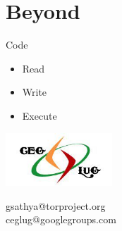 \documentclass{beamer}
\begin{document}
 \section{Beyond}
 \begin{frame} {Code}
  \begin{itemize} 
   \item Read
   \item Write
   \item Execute
  \end{itemize}
  \end{frame}
\begin{frame} [plain]
 \begin{center}
  \includegraphics[height=2cm]{ceglug.jpg}
 \end{center}
 \begin{center}
  gsathya@torproject.org \\
  ceglug@googlegroups.com
 \end{center}    
\end{frame}
\end{document}
